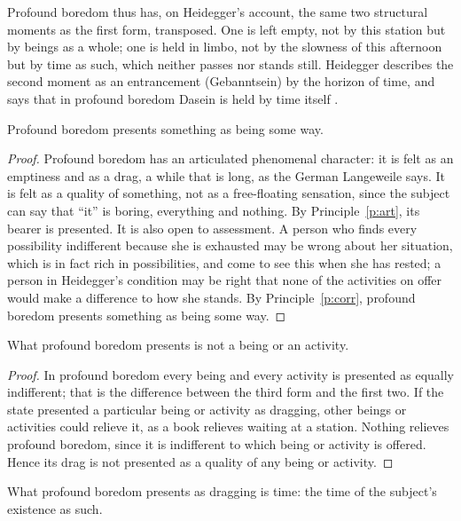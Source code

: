 \documentclass{situationist-preprint}
\begin{document}
Profound boredom thus has, on Heidegger's account, the same two structural moments as the first form, transposed. One is left empty, not by this station but by beings as a whole; one is held in limbo, not by the slowness of this afternoon but by time as such, which neither passes nor stands still. Heidegger describes the second moment as an entrancement (Gebanntsein) by the horizon of time, and says that in profound boredom Dasein is held by time itself \citep{Heidegger1995}.

\begin{lemma}\label{l:corr}
Profound boredom presents something as being some way.
\end{lemma}

\begin{proof}
Profound boredom has an articulated phenomenal character: it is felt as an emptiness and as a drag, a while that is long, as the German Langeweile says. It is felt as a quality of something, not as a free-floating sensation, since the subject can say that \enquote{it} is boring, everything and nothing. By Principle~\ref{p:art}, its bearer is presented. It is also open to assessment. A person who finds every possibility indifferent because she is exhausted may be wrong about her situation, which is in fact rich in possibilities, and come to see this when she has rested; a person in Heidegger's condition may be right that none of the activities on offer would make a difference to how she stands. By Principle~\ref{p:corr}, profound boredom presents something as being some way.
\end{proof}

\begin{lemma}\label{l:notbeing}
What profound boredom presents is not a being or an activity.
\end{lemma}

\begin{proof}
In profound boredom every being and every activity is presented as equally indifferent; that is the difference between the third form and the first two. If the state presented a particular being or activity as dragging, other beings or activities could relieve it, as a book relieves waiting at a station. Nothing relieves profound boredom, since it is indifferent to which being or activity is offered. Hence its drag is not presented as a quality of any being or activity.
\end{proof}

\begin{lemma}\label{l:time}
What profound boredom presents as dragging is time: the time of the subject's existence as such.
\end{lemma}
\end{document}
